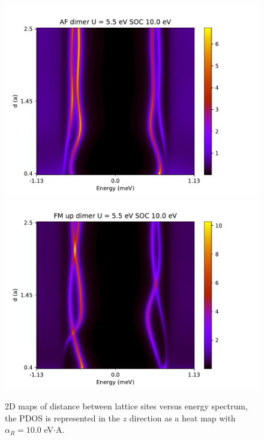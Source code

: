 \documentclass[letterpaper,12pt]{article}
\begin{document}
\begin{figure}[h!]
    \includegraphics[scale = .5]{AF_dimer_SOC_10_U.pdf}
    \includegraphics[scale = .5]{FM_dimer_SOC_10_U.pdf}
    
    \caption{2D maps of distance between lattice sites versus energy spectrum, the PDOS is represented in the $z$ direction as a heat map with $\alpha_R = 10.0$ eV$\cdot$A.}
    \label{dimerwithSOC}
\end{figure}
\end{document}
